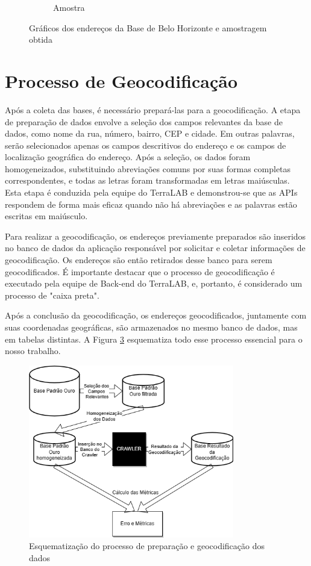 \begin{figure}[ht]
\begin{subfigure}[b]{0.45\textwidth}
      \caption{Amostra}
      \label{fig:baseBhA}
    \end{subfigure}
    \caption{Gráficos dos endereços da Base de Belo Horizonte e amostragem obtida}
    \label{fig:baseBh}
\end{figure}

\section{Processo de Geocodificação}
\label{processoGeo}

Após a coleta das bases, é necessário prepará-las para a geocodificação. A etapa de preparação de dados envolve a seleção dos campos relevantes da base de dados, como nome da rua, número, bairro, CEP e cidade. Em outras palavras, serão selecionados apenas os campos descritivos do endereço e os campos de localização geográfica do endereço. Após a seleção, os dados foram homogeneizados, substituindo abreviações comuns por suas formas completas correspondentes, e todas as letras foram transformadas em letras maiúsculas. Esta etapa é conduzida pela equipe do TerraLAB e demonstrou-se que as APIs respondem de forma mais eficaz quando não há abreviações e as palavras estão escritas em maiúsculo.

Para realizar a geocodificação, os endereços previamente preparados são inseridos no banco de dados da aplicação responsável por solicitar e coletar informações de geocodificação. Os endereços são então retirados desse banco para serem geocodificados. É importante destacar que o processo de geocodificação é executado pela equipe de Back-end do TerraLAB, e, portanto, é considerado um processo de "caixa preta".

Após a conclusão da geocodificação, os endereços geocodificados, juntamente com suas coordenadas geográficas, são armazenados no mesmo banco de dados, mas em tabelas distintas. A Figura \ref{fig:diagramaMono} esquematiza todo esse processo essencial para o nosso trabalho.

\begin{figure}
    \centering
    \includegraphics[width=0.8\textwidth]{Figuras/diagrama monografia.drawio.png}
    \caption{Esquematização do processo de preparação e geocodificação dos dados}
    \label{fig:diagramaMono}
\end{figure}

